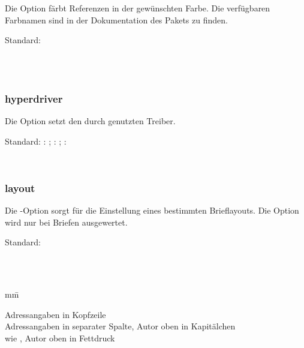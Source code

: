 Die Option  färbt Referenzen in der gewünschten Farbe.
Die verfügbaren Farbnamen sind in der Dokumentation des Pakets  zu finden.

Standard: 

\begin{nutzung}
		\>\\
	\beispiel
		\>\\
		\>
\end{nutzung}

\subsubsection{hyperdriver}

Die Option  setzt den durch  genutzten Treiber.

Standard: : ; : ; : 

\begin{nutzung}
		\>\\
	\beispiel
		\>
\end{nutzung}


\subsubsection{layout}

Die -Option sorgt für die Einstellung eines bestimmten Brieflayouts.
Die Option wird nur bei Briefen ausgewertet.

Standard: 

\begin{nutzung}
		\>\\
	\beispiel
		\>\\
		\>
\end{nutzung}

\begin{tabbing}
	mm\=\kill

	\>Adressangaben in Kopfzeile\\
	\>Adressangaben in separater Spalte, Autor oben in Kapitälchen\\
	\>wie , Autor oben in Fettdruck
\end{tabbing}

